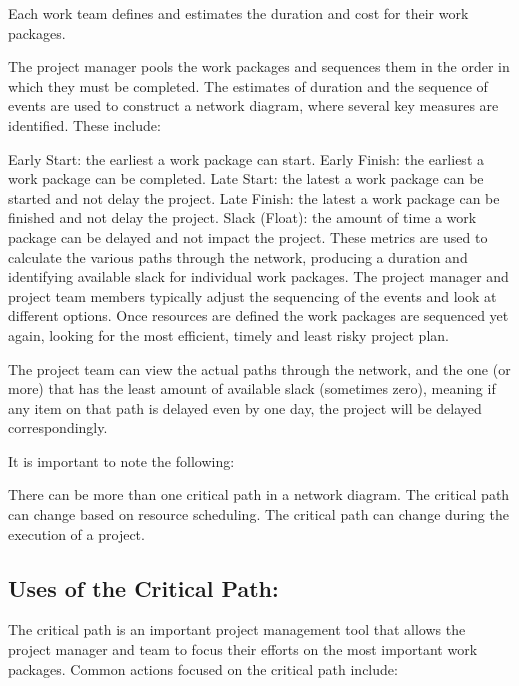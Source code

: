 Each work team defines and estimates the duration and cost for their work packages.

The project manager pools the work packages and sequences them in the order in which they must be completed. The estimates of duration and the sequence of events are used to construct a network diagram, where several key measures are identified. These include: 

Early Start: the earliest a work package can start. 
Early Finish: the earliest a work package can be completed.
Late Start: the latest a work package can be started and not delay the project.
Late Finish: the latest a work package can be finished and not delay the project.
Slack (Float): the amount of time a work package can be delayed and not impact the project.
These metrics are used to calculate the various paths through the network, producing a duration and identifying available slack for individual work packages. The project manager and project team members typically adjust the sequencing of the events and look at different options. Once resources are defined the work packages are sequenced yet again, looking for the most efficient, timely and least risky project plan. 

The project team can view the actual paths through the network, and the one (or more) that has the least amount of available slack (sometimes zero), meaning if any item on that path is delayed even by one day, the project will be delayed correspondingly. 

It is important to note the following:

There can be more than one critical path in a network diagram.
The critical path can change based on resource scheduling. 
The critical path can change during the execution of a project. 

\subsection{Uses of the Critical Path:}

The critical path is an important project management tool that allows the project manager and team to focus their efforts on the most important work packages. Common actions focused on the critical path include: 

